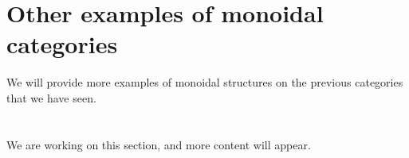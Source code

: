 \section{Other examples of monoidal categories}
\begin{publictodo}
    We will provide more examples of monoidal structures 
    on the previous categories that we have seen.
\end{publictodo}

\section{}
\label{sec:premonoidal}
\begin{publictodo}We are working on this section, and more content will appear.\end{publictodo}



\devel{
    
}
